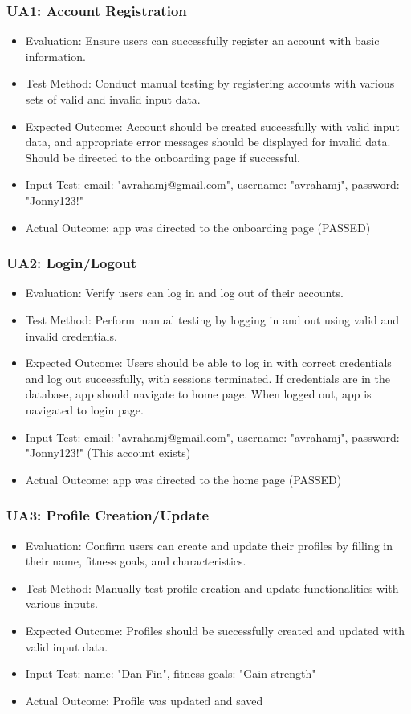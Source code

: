 \documentclass[12pt, titlepage]{article}
\begin{document}
\subsubsection{UA1: Account Registration}
\begin{itemize}
    \item Evaluation: Ensure users can successfully register an account with basic information.
    \item Test Method: Conduct manual testing by registering accounts with various sets of valid and invalid input data.
    \item Expected Outcome: Account should be created successfully with valid input data, and appropriate error messages should be displayed for invalid data. Should be directed to the onboarding page if successful.
    \item Input Test: email: "avrahamj@gmail.com", username: "avrahamj", password: "Jonny123!"
    \item Actual Outcome: app was directed to the onboarding page (PASSED)
\end{itemize} 
\subsubsection{UA2: Login/Logout}
\begin{itemize}
    \item Evaluation: Verify users can log in and log out of their accounts.
    \item Test Method: Perform manual testing by logging in and out using valid and invalid credentials. 
    \item Expected Outcome: Users should be able to log in with correct credentials and log out successfully, with sessions terminated. If credentials are in the database, app should navigate to home page. When logged out, app is navigated to login page. 
    \item Input Test: email: "avrahamj@gmail.com", username: "avrahamj", password: "Jonny123!" (This account exists)
    \item Actual Outcome: app was directed to the home page (PASSED)
\end{itemize} 
\subsubsection{UA3: Profile Creation/Update}
\begin{itemize}
    \item Evaluation: Confirm users can create and update their profiles by filling in their name, fitness goals, and characteristics.
    \item Test Method: Manually test profile creation and update functionalities with various inputs.
    \item Expected Outcome: Profiles should be successfully created and updated with valid input data. 
    \item Input Test: name: "Dan Fin", fitness goals: "Gain strength"
    \item Actual Outcome: Profile was updated and saved
\end{itemize} 
\end{document}
